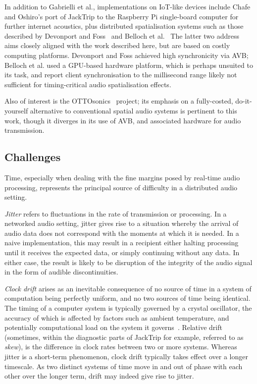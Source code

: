 In addition to Gabrielli et al., implementations on IoT-like devices include
Chafe and Oshiro's port of JackTrip to the Raspberry Pi single-board computer
for further internet acoustics, plus distributed spatialisation systems such as
those described by Devonport and Foss~\citep{devonport_distribution_2019} and
Belloch et al.~\citep{belloch_performance_2021}
The latter two address aims closely aligned with the work described here, but
are based on costly computing platforms.
Devonport and Foss achieved high synchronicity via AVB; Belloch et al. used a
GPU-based hardware platform, which is perhaps unsuited to its task, and report
client synchronisation to the millisecond range \textemdash{} likely not
sufficient for timing-critical audio spatialisation effects.

Also of interest is the OTTOsonics~\citep{mitterhuber_ottosonics_nodate}
project;
its emphasis on a fully-costed, do-it-yourself alternative to conventional
spatial audio systems is pertinent to this work, though it diverges in its use
of AVB, and associated hardware for audio transmission.

\subsection{Challenges}\label{subsec:challenges}

Time, especially when dealing with the fine margins posed by real-time audio
processing, represents the principal source of difficulty in a distributed
audio setting.

\textit{Jitter} refers to fluctuations in the rate of transmission or
processing.
In a networked audio setting, jitter gives rise to a situation whereby the
arrival of audio data does not correspond with the moments at which it is
needed.
In a naive implementation, this may result in a recipient either halting
processing until it receives the expected data, or simply continuing without
any data.
In either case, the result is likely to be disruption of the integrity of the
audio signal in the form of audible discontinuities.

\textit{Clock drift} arises as an inevitable consequence of no source of time
in a system of computation being perfectly uniform, and no two sources of time
being identical.
The timing of a computer system is typically governed by a crystal oscillator,
the accuracy of which is affected by factors such as ambient temperature, and
potentially computational load on the system it
governs~\citep{marouani_internal_2008}.
Relative drift (sometimes, within the diagnostic parts of JackTrip for example,
referred to as \textit{skew}), is the difference in clock rates between two or
more systems.
Whereas jitter is a short-term phenomenon, clock drift typically takes effect
over a longer timescale.
As two distinct systems of time move in and out of phase with each other over
the longer term, drift may indeed give rise to jitter.

